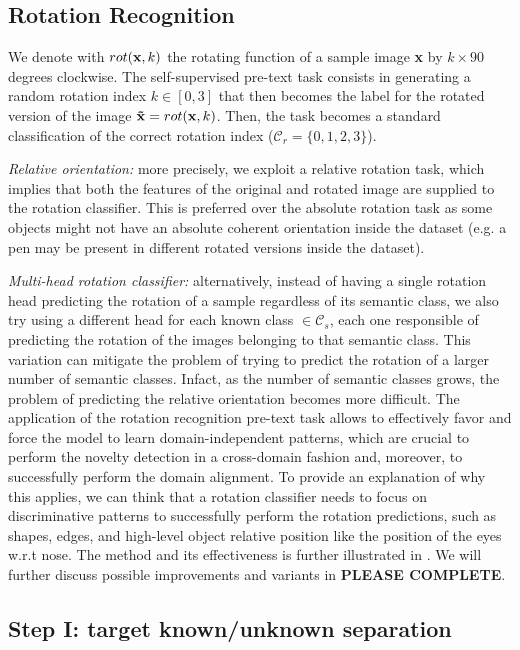 \documentclass[10pt,twocolumn,letterpaper]{article}
\begin{document}
\subsection{Rotation Recognition}

We denote with $rot({\bf x}, k)$ the rotating function of a sample image {\bf x} by $k\times 90$ degrees clockwise.
The self-supervised pre-text task consists in generating a random rotation index $k \in [0, 3]$ that then becomes
the label for the rotated version of the image ${\bf \tilde{x}} = rot({\bf x}, k)$.
Then, the task becomes a standard classification of the correct rotation index ($\mathcal{C}_r = \{0, 1, 2, 3\}$).

{\it Relative orientation:}
more precisely, we exploit a relative rotation task,
which implies that both the features of the original and rotated image are supplied to the rotation classifier.
This is preferred over the absolute rotation task as some objects might not have an absolute coherent orientation
inside the dataset
(e.g. a pen may be present in different rotated versions inside the dataset). 

{\it Multi-head rotation classifier:}
alternatively, 
instead of having a single rotation head predicting the rotation of a sample regardless of its semantic class, 
we also try using a different head for each known class $\in \mathcal{C}_s$, each one responsible of predicting the rotation
of the images belonging to that semantic class.
This variation can mitigate the problem of trying to predict the rotation of a larger number
of semantic classes. Infact, as the number of semantic classes grows,
the problem of predicting the relative orientation becomes more difficult.
The application of the rotation recognition pre-text task allows to effectively favor and force the model to learn
domain-independent patterns, which are crucial to perform the novelty detection in a cross-domain fashion and, moreover,
to successfully perform the domain alignment.
To provide an explanation of why this applies, we can think that a rotation classifier needs to focus on discriminative patterns to
successfully perform the rotation predictions, such as shapes, edges, and high-level object relative position like the position of the eyes
w.r.t nose.
The method and its effectiveness is further illustrated in \cite{OldROS}. 
We will further discuss possible improvements and variants in {\bf PLEASE COMPLETE}.

\subsection{Step I: target known/unknown separation}
\end{document}
